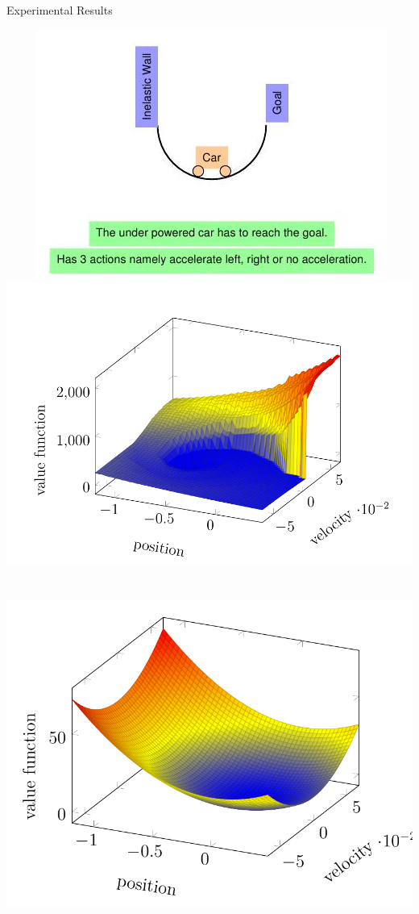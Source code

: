\documentclass[10pt,handout]{beamer}
\begin{document}
\begin{frame}{Experimental Results}
\begin{block}{}
$\mbox{ }$
$\mbox{ }$$\mbox{ }$
\includegraphics[scale=0.29]{mcarpic.jpeg}
$\mbox{ }$
\includegraphics[scale=0.21]{actval.jpeg}\\
$\mbox{ }$\\
$\mbox{ }$
\includegraphics[scale=0.21]{basisval.jpeg}
$$
\end{block}
\end{frame}
\end{document}
